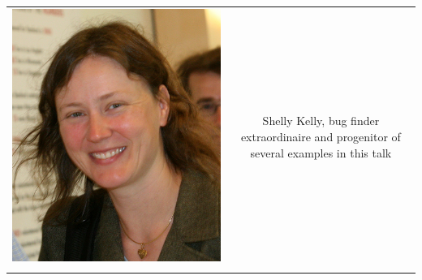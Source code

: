\documentclass[10pt, xcolor=x11names, compress]{beamer}
\begin{document}
\begin{frame}
\begin{tabular}{cc}
\begin{minipage}{0.1\linewidth}
      \includegraphics[width=\linewidth]{mugs/shelly.jpg}
    \end{minipage}&
    \begin{minipage}{0.7\linewidth}
      Shelly Kelly, bug finder extraordinaire and progenitor of several
      examples in this talk
    \end{minipage} \\
    \begin{minipage}{0.1\linewidth}

\end{minipage}
\end{tabular}
\end{frame}
\end{document}
